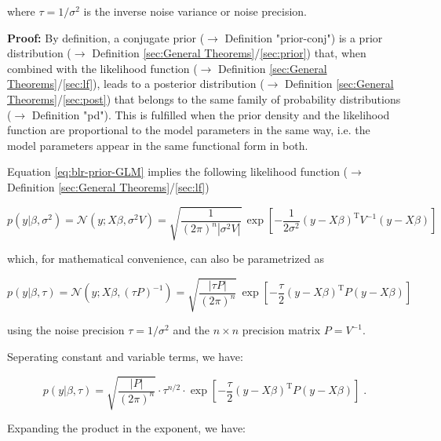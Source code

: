 \documentclass[a4paper,12pt]{book}
\begin{document}
where $\tau = 1/\sigma^2$ is the inverse noise variance or noise precision.


\vspace{1em}
\textbf{Proof:} By definition, a conjugate prior ($\rightarrow$ Definition "prior-conj") is a prior distribution ($\rightarrow$ Definition \ref{sec:General Theorems}/\ref{sec:prior}) that, when combined with the likelihood function ($\rightarrow$ Definition \ref{sec:General Theorems}/\ref{sec:lf}), leads to a posterior distribution ($\rightarrow$ Definition \ref{sec:General Theorems}/\ref{sec:post}) that belongs to the same family of probability distributions ($\rightarrow$ Definition "pd"). This is fulfilled when the prior density and the likelihood function are proportional to the model parameters in the same way, i.e. the model parameters appear in the same functional form in both.

Equation \eqref{eq:blr-prior-GLM} implies the following likelihood function ($\rightarrow$ Definition \ref{sec:General Theorems}/\ref{sec:lf})

\begin{equation} \label{eq:blr-prior-GLM-LF-class}
p(y|\beta,\sigma^2) = \mathcal{N}(y; X \beta, \sigma^2 V) = \sqrt{\frac{1}{(2 \pi)^n |\sigma^2 V|}} \, \exp\left[ -\frac{1}{2 \sigma^2} (y-X\beta)^\mathrm{T} V^{-1} (y-X\beta) \right]
\end{equation}

which, for mathematical convenience, can also be parametrized as

\begin{equation} \label{eq:blr-prior-GLM-LF-Bayes}
p(y|\beta,\tau) = \mathcal{N}(y; X \beta, (\tau P)^{-1}) = \sqrt{\frac{|\tau P|}{(2 \pi)^n}} \, \exp\left[ -\frac{\tau}{2} (y-X\beta)^\mathrm{T} P (y-X\beta) \right]
\end{equation}

using the noise precision $\tau = 1/\sigma^2$ and the $n \times n$ precision matrix $P = V^{-1}$.

\vspace{1em}
Seperating constant and variable terms, we have:

\begin{equation} \label{eq:blr-prior-GLM-LF-s1}
p(y|\beta,\tau) = \sqrt{\frac{|P|}{(2 \pi)^n}} \cdot \tau^{n/2} \cdot \exp\left[ -\frac{\tau}{2} (y-X\beta)^\mathrm{T} P (y-X\beta) \right] \; .
\end{equation}

Expanding the product in the exponent, we have:
\end{document}
